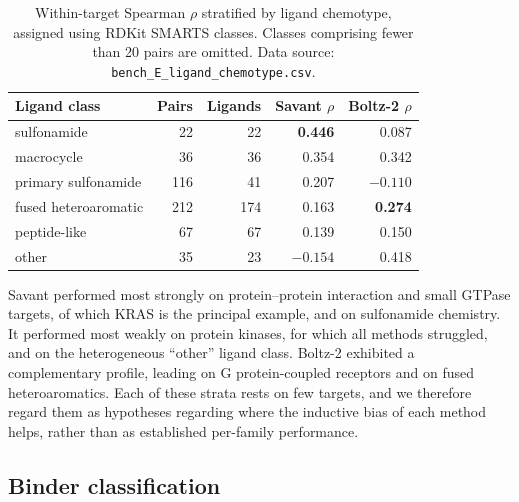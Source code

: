 \documentclass[11pt]{article}
\begin{document}
\begin{table}[H]
\centering
\caption{Within-target Spearman $\rho$ stratified by ligand chemotype, assigned
using RDKit SMARTS classes. Classes comprising fewer than 20 pairs are omitted.
Data source: \texttt{bench\_E\_ligand\_chemotype.csv}.}
\label{tab:teste}
\begin{tabular}{lrrrr}
\toprule
Ligand class & Pairs & Ligands & Savant $\rho$ & Boltz-2 $\rho$ \\
\midrule
sulfonamide            & 22  & 22  & \textbf{0.446} & 0.087 \\
macrocycle             & 36  & 36  & 0.354 & 0.342 \\
primary sulfonamide    & 116 & 41  & 0.207 & $-0.110$ \\
fused heteroaromatic   & 212 & 174 & 0.163 & \textbf{0.274} \\
peptide-like           & 67  & 67  & 0.139 & 0.150 \\
other                  & 35  & 23  & $-0.154$ & 0.418 \\
\bottomrule
\end{tabular}
\end{table}

Savant performed most strongly on protein--protein interaction and small GTPase
targets, of which KRAS is the principal example, and on sulfonamide chemistry.
It performed most weakly on protein kinases, for which all methods struggled,
and on the heterogeneous ``other'' ligand class. Boltz-2 exhibited a
complementary profile, leading on G protein-coupled receptors and on fused
heteroaromatics. Each of these strata rests on few targets, and we therefore
regard them as hypotheses regarding where the inductive bias of each method
helps, rather than as established per-family performance.

\subsection{Binder classification}
\end{document}

